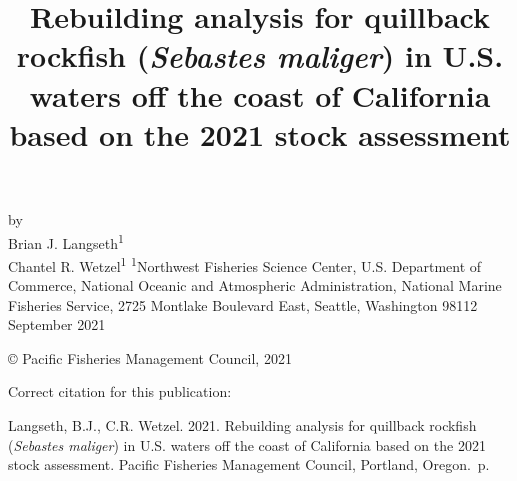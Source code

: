 \documentclass[11pt,
  english,
  a4paper,
]{article}
\date{}
\newcommand{\trTitle}{Rebuilding analysis for quillback rockfish (\emph{Sebastes maliger}) in U.S. waters off the coast of California based on the 2021 stock assessment}
\newcommand{\trYear}{2021}
\newcommand{\trMonth}{September}
\newcommand{\trAuthsBack}{Langseth, B.J., C.R. Wetzel}
\newcommand{\trCitation}{
\begin{hangparas}{1em}{1}
\trAuthsBack{}. \trYear{}. \trTitle{}. Pacific Fisheries Management Council, Portland, Oregon. \pageref{LastPage}{}\,p.
\end{hangparas}}
\begin{document}

\renewcommand*{\thefootnote}{\fnsymbol{footnote}}

\small
\thispagestyle{empty}
\noindent
\begin{center}
\title{Rebuilding analysis for quillback rockfish (\emph{Sebastes maliger}) in U.S. waters off the coast of California based on the 2021 stock assessment}
\vspace{1.5cm}
{\Large\textbf{}}
\vfill
by\\
Brian J. Langseth\textsuperscript{1}\\
Chantel R. Wetzel\textsuperscript{1}\vfill
\textsuperscript{1}Northwest Fisheries Science Center, U.S. Department of Commerce, National Oceanic and Atmospheric Administration, National Marine Fisheries Service, 2725 Montlake Boulevard East, Seattle, Washington 98112\vfill
\trMonth{} \trYear{}
\end{center}
\clearpage

\thispagestyle{empty}
\vspace*{\fill}
\begin{center}
\copyright{} Pacific Fisheries Management Council, \trYear{}\\
\end{center}
\par
\bigskip
\noindent
Correct citation for this publication:
\bigskip
\par
\trCitation{}
\clearpage


\tableofcontents\clearpage
\label{TRlastRoman}
\clearpage

\newpage
\thispagestyle{empty} %

\pagestyle{plain}  %
\renewcommand*{\thefootnote}{\arabic{footnote}}  %
\setcounter{footnote}{0}  %
\renewcommand{\headrulewidth}{0.5pt}
\renewcommand{\footrulewidth}{0.5pt}
\end{document}
